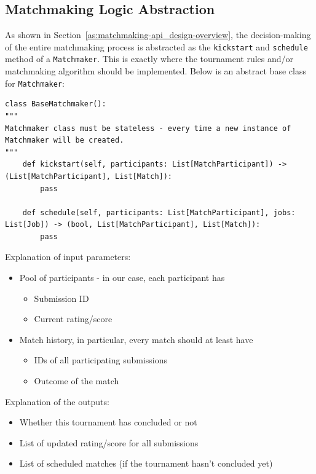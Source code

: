 \subsection{Matchmaking Logic Abstraction}
\label{as:matchmaking-api_design-matchmaking_logic_abstraction}
As shown in Section~\ref{as:matchmaking-api_design-overview}, the decision-making of the entire matchmaking process is abstracted as the \texttt{kickstart} and \texttt{schedule} method of a \texttt{Matchmaker}. This is exactly where the tournament rules and/or matchmaking algorithm should be implemented. Below is an abstract base class for \texttt{Matchmaker}:

\begin{code}
\begin{verbatim}
class BaseMatchmaker():
"""
Matchmaker class must be stateless - every time a new instance of Matchmaker will be created.
"""
    def kickstart(self, participants: List[MatchParticipant]) -> (List[MatchParticipant], List[Match]):
        pass

    def schedule(self, participants: List[MatchParticipant], jobs: List[Job]) -> (bool, List[MatchParticipant], List[Match]):
        pass
\end{verbatim}
\label{code:matchmaker-abc}
\end{code}

Explanation of input parameters:
\begin{itemize}
    \item Pool of participants - in our case, each participant has
    \begin{itemize}
        \item Submission ID
        \item Current rating/score
    \end{itemize}
    \item Match history, in particular, every match should at least have
    \begin{itemize}
        \item IDs of all participating submissions
        \item Outcome of the match
    \end{itemize}
\end{itemize}

Explanation of the outputs:
\begin{itemize}
    \item Whether this tournament has concluded or not
    \item List of updated rating/score for all submissions
    \item List of scheduled matches (if the tournament hasn't concluded yet)
\end{itemize}
